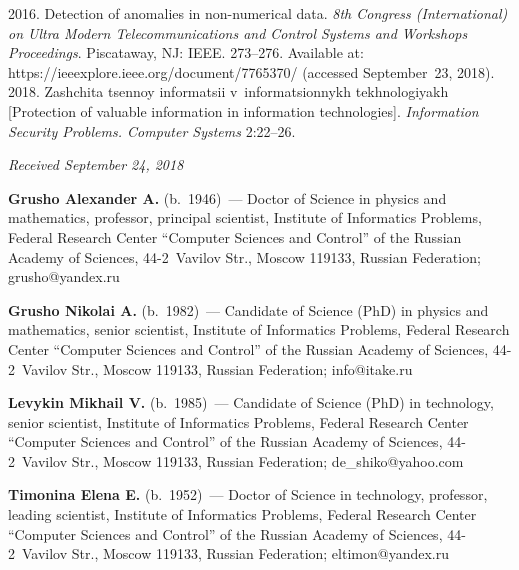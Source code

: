 \begin{multicols}{2}
{{\begin{thebibliography}{9}
 2016. Detection of anomalies in non-numerical data. 
\textit{8th Congress (International) on Ultra Modern Telecommunications and Control Systems and 
Workshops Proceedings}. Piscataway, NJ: IEEE. 273--276.
Available at: {\sf https://ieeexplore.ieee.\linebreak org/document/7765370/} (accessed September~23, 2018). 
 2018. Zashchita tsennoy 
informatsii v~informatsionnykh tekhnologiyakh [Protection of valuable information in information 
technologies]. \textit{Information Security Problems. Computer Systems} 2:22--26.
\end{thebibliography}

 }
 }

\end{multicols}

\vspace*{-6pt}

\hfill{\small\textit{Received September 24, 2018}}



\Contr

\noindent
\textbf{Grusho Alexander A.} (b.\ 1946)~--- Doctor of Science in physics and 
mathematics, professor, principal scientist, Institute of Informatics Problems, Federal 
Research Center ``Computer Sciences and Control'' of the Russian Academy of 
Sciences, 44-2~Vavilov Str., Moscow 119133, Russian Federation; 
\mbox{grusho@yandex.ru}

\vspace*{3pt}

\noindent
\textbf{Grusho Nikolai A.} (b.\ 1982)~--- Candidate of Science (PhD) in physics 
and mathematics, senior scientist, Institute of Informatics Problems, Federal 
Research Center ``Computer Sciences and Control'' of the Russian Academy of 
Sciences, 44-2~Vavilov Str., Moscow 119133, Russian Federation; 
\mbox{info@itake.ru}

\vspace*{3pt}

\noindent
\textbf{Levykin Mikhail V.} (b.\ 1985)~--- Candidate of Science (PhD) in 
technology, senior scientist, Institute of Informatics Problems, Federal Research 
Center ``Computer Sciences and Control'' of the Russian Academy of Sciences,  
44-2~Vavilov Str., Moscow 119133, Russian Federation; 
\mbox{de\_shiko@yahoo.com}

\vspace*{3pt}

\noindent
\textbf{Timonina Elena E.} (b.\ 1952)~--- Doctor of Science in technology, 
professor, leading scientist, Institute of Informatics Problems, Federal Research 
Center ``Computer Sciences and Control'' of the Russian Academy of Sciences,  
44-2~Vavilov Str., Moscow 119133, Russian Federation; 
\mbox{eltimon@yandex.ru} 

\label{end\stat}

\renewcommand{\bibname}{\protect\rm Литература}       